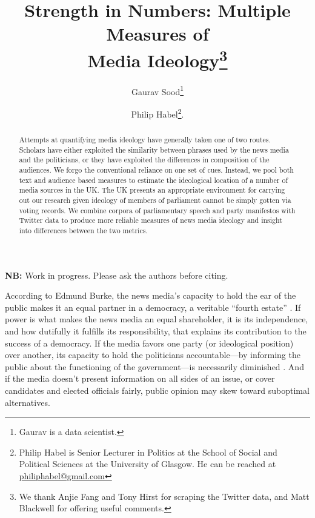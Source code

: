 \documentclass[12pt, letterpaper]{article}
\title{Strength in Numbers: Multiple Measures of \\Media Ideology\footnote{We thank Anjie Fang and Tony Hirst for scraping the Twitter data, and Matt Blackwell for offering useful comments.}}
\author{Gaurav Sood\thanks{Gaurav is a data scientist.} \and Philip Habel\thanks{Philip Habel is Senior Lecturer in Politics at the School of Social and Political Sciences at the University of Glasgow. He can be reached at \href{mailto:philiphabel@gmail.com}{philiphabel@gmail.com}}.}
\begin{document}
\maketitle

\begin{center}
\vspace{1cm}\textbf{NB:} Work in progress. Please ask the authors before citing.\\\vspace{1cm}
\end{center}

\begin{abstract}

\noindent Attempts at quantifying media ideology have generally taken one of two routes. Scholars have either exploited the similarity between phrases used by the news media and the politicians, or they have exploited the differences in composition of the audiences. We forgo the conventional reliance on one set of cues. Instead, we pool both text and audience based measures to estimate the ideological location of a number of media sources in the UK. The UK presents an appropriate environment for carrying out our research given ideology of members of parliament cannot be simply gotten via voting records. We combine corpora of parliamentary speech and party manifestos with Twitter data to produce more reliable measures of news media ideology and insight into differences between the two metrics.
\end{abstract}

\newpage
\doublespacing

According to Edmund Burke, the news media's capacity to hold the ear of the public makes it an equal partner in a democracy, a veritable ``fourth estate'' \citep{carlyle2003heroes}.  If power is what makes the news media an equal shareholder, it is its independence, and how dutifully it fulfills its responsibility, that explains its contribution to the success of a democracy. If the media favors one party (or ideological position) over another, its capacity to hold the politicians accountable---by informing the public about the functioning of the government---is necessarily diminished \citep[see, for e.g.,][]{larcinese2011}. And if the media doesn't present information on all sides of an issue, or cover candidates and elected officials fairly, public opinion may skew toward suboptimal alternatives.
\end{document}
